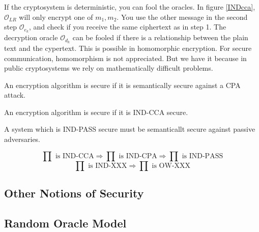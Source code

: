 If the cryptosystem is deterministic, you can fool the oracles. In figure \ref{INDcca}, $\mathcal{O}_{LR}$ will only encrypt one of $m_1, m_2$. You use the other message in the second step $\mathcal{O}_{e_k}$, and check if you receive the same ciphertext as in step 1.
The decryption oracle $\mathcal{O}_{d_k}$ can be fooled if there is a relationship between the plain text and the cypertext. This is possible in homomorphic encryption.
For secure communication, homomorphism is not appreciated. But we have it because in public cryptosystems we rely on mathematically difficult problems.
\begin{defn}
An encryption algorithm is secure if it is semantically secure against a CPA attack.
\end{defn}

\begin{defn}
An encryption algorithm is secure if it is IND-CCA secure.
\end{defn}

\begin{thm}
A system which is IND-PASS secure must be semanticallt secure against passive adversaries.

\[ \prod \text{ is IND-CCA} \Rightarrow \prod \text{ is IND-CPA} \Rightarrow \prod \text{ is IND-PASS} \] 
\[ \prod \text{ is IND-XXX} \Rightarrow \prod \text{ is OW-XXX} \]
\end{thm}

\subsection{Other Notions of Security}

\subsection{Random Oracle Model}
